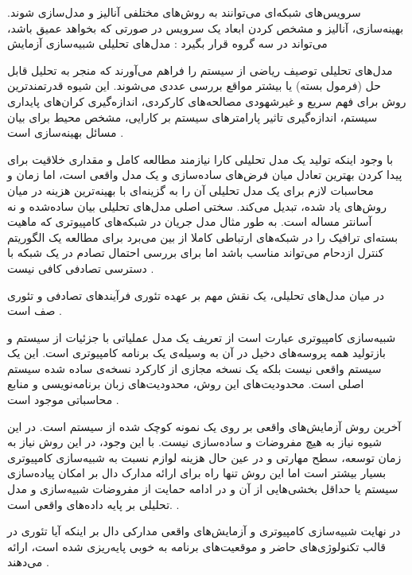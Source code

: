 
سرویس‌های شبکه‌ای می‌توانند به روش‌های مختلفی آنالیز و مدل‌سازی شوند.
بهینه‌سازی، آنالیز و مشخص کردن ابعاد یک سرویس در صورتی که بخواهد عمیق باشد، می‌تواند در سه گروه قرار بگیرد
:
 مدل‌های تحلیلی
 شبیه‌سازی
 آزمایش

مدل‌های تحلیلی توصیف ریاضی از سیستم را فراهم می‌آورند که منجر به تحلیل قابل حل (فرمول بسته) یا بیشتر مواقع بررسی عددی می‌شوند.
این شیوه قدرتمند‌ترین روش برای فهم سریع و غیرشهودی مصالحه‌های کارکردی، اندازه‌گیری کران‌های پایداری سیستم،
اندازه‌گیری تاثیر پارامترهای سیستم بر کارایی، مشخص محیط برای بیان مسائل بهینه‌سازی است
.

با وجود اینکه تولید یک مدل تحلیلی کارا نیازمند مطالعه کامل و مقداری خلاقیت برای پیدا کردن بهترین تعادل میان
فرض‌های ساده‌سازی و یک مدل واقعی است، اما زمان و محاسبات لازم برای یک مدل تحلیلی آن را به گزینه‌ای با بهینه‌ترین
هزینه در میان روش‌های یاد شده، تبدیل می‌کند.
سختی اصلی مدل‌های تحلیلی بیان ساده‌شده و نه آسانتر مساله است. به طور مثال مدل جریان در شبکه‌های کامپیوتری
که ماهیت بسته‌ای ترافیک را در شبکه‌های ارتباطی کاملا از بین می‌برد برای مطالعه یک الگوریتم کنترل ازدحام می‌تواند
مناسب باشد اما برای بررسی احتمال تصادم در یک شبکه با دسترسی تصادفی کافی نیست
.

در میان مدل‌های تحلیلی، یک نقش مهم بر عهده تئوری فرآیندهای تصادفی و تئوری صف است
.

شبیه‌سازی کامپیوتری عبارت است از تعریف یک مدل عملیاتی با جزئیات از سیستم و بازتولید
همه پروسه‌های دخیل در آن به وسیله‌ی یک برنامه کامپیوتری است.
این یک سیستم واقعی نیست بلکه یک نسخه مجازی از کارکرد نسخه‌ی ساده شده سیستم اصلی است.
محدودیت‌های این روش، محدودیت‌های زبان برنامه‌نویسی و منابع محاسباتی موجود است
.

آخرین روش آزمایش‌های واقعی بر روی یک نمونه کوچک شده از سیستم است.
در این شیوه نیاز به هیچ مفروضات و ساده‌سازی نیست.
با این وجود، در این روش نیاز به زمان توسعه، سطح مهارتی و در عین حال هزینه لوازم نسبت به شبیه‌سازی کامپیوتری بسیار بیشتر است
اما این روش تنها راه برای ارائه مدارک دال بر امکان پیاده‌سازی سیستم یا حداقل بخشی‌هایی از آن و در ادامه حمایت از مفروضات شبیه‌سازی
و مدل تحلیلی بر پایه داده‌های واقعی است.
.

در نهایت شبیه‌سازی کامپیوتری و آزمایش‌های واقعی مدارکی دال بر اینکه آیا تئوری در قالب تکنولوژی‌های حاضر و موقعیت‌های برنامه
به خوبی پایه‌ریزی شده است، ارائه می‌دهند
.
